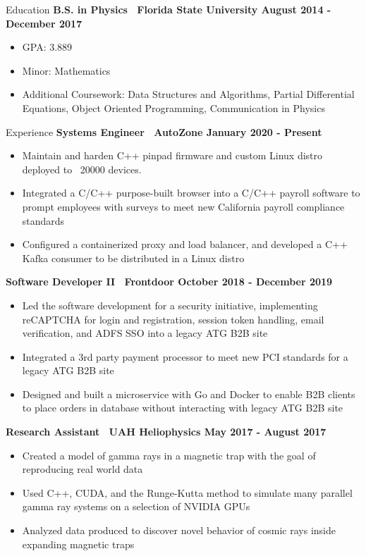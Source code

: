 \documentclass{resume} %
\begin{document}
\begin{rSection}{Education}
    {\bf B.S. in Physics \textbar\ Florida State University \hfill August 2014 - December 2017}
    \begin{itemize}
        \item GPA: 3.889
        \item Minor: Mathematics
        \item Additional Coursework: Data Structures and Algorithms, Partial Differential Equations, Object Oriented Programming, Communication in Physics
    \end{itemize}
\end{rSection}

\begin{rSection}{Experience}
    {\bf Systems Engineer \textbar\ AutoZone \hfill January 2020 - Present}
    \begin{itemize}
        \item Maintain and harden C++ pinpad firmware and custom Linux distro deployed to ~20000 devices.
        \item Integrated a C/C++ purpose-built browser into a C/C++ payroll software to prompt employees with surveys to meet new California payroll compliance standards
        \item Configured a containerized proxy and load balancer, and developed a C++ Kafka consumer to be distributed in a Linux distro
    \end{itemize}

    {\bf Software Developer II \textbar\ Frontdoor \hfill October 2018 - December 2019}
    \begin{itemize}
        \item Led the software development for a security initiative, implementing reCAPTCHA for login and registration, session token handling, email verification, and ADFS SSO into a legacy ATG B2B site
        \item Integrated a 3rd party payment processor to meet new PCI standards for a legacy ATG B2B site
        \item Designed and built a microservice with Go and Docker to enable B2B clients to place orders in database without interacting with legacy ATG B2B site
    \end{itemize}
    
    {\bf Research Assistant \textbar\ UAH Heliophysics \hfill May 2017 - August 2017}
    \begin{itemize}
        \item Created a model of gamma rays in a magnetic trap with the goal of reproducing real world data
        \item Used C++, CUDA, and the Runge-Kutta method to simulate many parallel gamma ray systems on a selection of NVIDIA GPUs
        \item Analyzed data produced to discover novel behavior of cosmic rays inside expanding magnetic traps
    \end{itemize}
    

\end{rSection}
\end{document}
